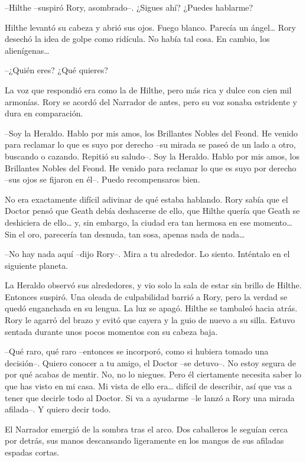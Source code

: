 {--Hilthe --suspiró Rory, asombrado--. ¿Sigues ahí? ¿Puedes hablarme?}

{Hilthe levantó su cabeza y abrió sus ojos. Fuego blanco. Parecía un
	ángel\ldots{} Rory desechó la idea de golpe como ridícula. No había tal
	cosa. En cambio, los alienígenas\ldots{}}

{--¿Quién eres? ¿Qué quieres?}

{La voz que respondió era como la de Hilthe, pero más rica y dulce con
	cien mil armonías. Rory se acordó del Narrador de antes, pero su voz
sonaba estridente y dura en comparación.}

{--Soy la Heraldo. Hablo por mis amos, los Brillantes Nobles del
	Feond. He venido para reclamar lo que es suyo por derecho --su mirada se
	paseó de un lado a otro, buscando o cazando. Repitió su saludo--. Soy la
	Heraldo. Hablo por mis amos, los Brillantes Nobles del Feond. He venido
	para reclamar lo que es suyo por derecho --sus ojos se fijaron en él--.
Puedo recompensaros bien.}

{No era exactamente difícil adivinar de qué estaba hablando. Rory sabía
	que el Doctor pensó que Geath debía deshacerse de ello, que Hilthe
	quería que Geath se deshiciera de ello\ldots{} y, sin embargo, la ciudad
	era tan hermosa en ese momento\ldots{} Sin el oro, parecería tan
	desnuda, tan sosa, apenas nada de nada\ldots{}}

{--No hay nada aquí --dijo Rory--. Mira a tu alrededor. Lo siento.
Inténtalo en el siguiente planeta.}

{La Heraldo observó sus alrededores, y vio solo la sala de estar sin
	brillo de Hilthe. Entonces suspiró. Una oleada de culpabilidad barrió a
	Rory, pero la verdad se quedó enganchada en su lengua. La luz se apagó.
	Hilthe se tambaleó hacia atrás. Rory le agarró del brazo y evitó que
	cayera y la guio de nuevo a su silla. Estuvo sentada durante unos pocos
momentos con su cabeza baja.}

{--Qué raro, qué raro --entonces se incorporó, como si hubiera tomado
	una decisión--. Quiero conocer a tu amigo, el Doctor --se detuvo--. No
	estoy segura de por qué acabas de mentir. No, no lo niegues. Pero él
	ciertamente necesita saber lo que has visto en mi casa. Mi vista de ello
	era\ldots{} difícil de describir, así que vas a tener que decirle todo
	al Doctor. Si va a ayudarme --le lanzó a Rory una mirada afilada--. Y
quiero decir todo.}

\mbox{}

{El Narrador emergió de la sombra tras el arco. Dos caballeros le
	seguían cerca por detrás, sus manos descansando ligeramente en los
mangos de sus afiladas espadas cortas.}

